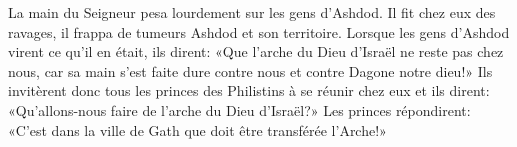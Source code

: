 La main du Seigneur pesa lourdement sur les gens d’Ashdod.
	Il fit chez eux des ravages, il frappa de tumeurs Ashdod et son territoire.
Lorsque les gens d’Ashdod virent ce qu’il en était, ils dirent:
	«Que l’arche du Dieu d’Israël ne reste pas chez nous,
	car sa main s’est faite dure contre nous et contre Dagone notre dieu!»
Ils invitèrent donc tous les princes des Philistins à se réunir chez eux et ils dirent:
	«Qu’allons-nous faire de l’arche du Dieu d’Israël?»
Les princes répondirent:
	«C’est dans la ville de Gath que doit être transférée l’Arche!»
